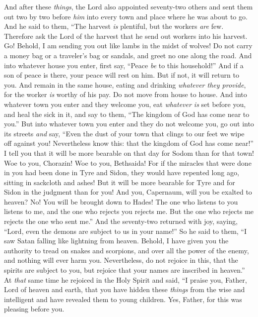 \begin{biblechapter} %
 And after these \textit{things}, the Lord also appointed seventy-two others and sent them out two by two before \textit{him} into every town and place where he was about to go.
\verse And he said to them, “The harvest \textit{is} plentiful, but the workers \textit{are} few. Therefore ask the Lord of the harvest that he send out workers into his harvest.
\verse Go! Behold, I am sending you out like lambs in the midst of wolves!
\verse Do not carry a money bag or a traveler’s bag or sandals, and greet no one along the road.
\verse And into whatever house you enter, first say, “Peace \textit{be} to this household!”
\verse And if a son of peace is there, your peace will rest on him. But if not, it will return to you.
\verse And remain in the same house, eating and drinking \textit{whatever they provide}, for the worker \textit{is} worthy of his pay. Do not move from house to house.
\verse And into whatever town you enter and they welcome you, eat \textit{whatever is} set before you,
\verse and heal the sick in it, and say to them, “The kingdom of God has come near to you.”
\verse But into whatever town you enter and they do not welcome you, go out into its streets \textit{and} say,
\verse “Even the dust of your town that clings to our feet we wipe off against you! Nevertheless know this: that the kingdom of God has come near!”
\verse I tell you that it will be more bearable on that day for Sodom than for that town!
\verse Woe to you, Chorazin! Woe to you, Bethsaida! For if the miracles that were done in you had been done in Tyre and Sidon, they would have repented long ago, sitting in sackcloth and ashes!
\verse But it will be more bearable for Tyre and for Sidon in the judgment than for you!
\verse And you, Capernaum, will you be exalted to heaven? No! You will be brought down to Hades!
\verse The one who listens to you listens to me, and the one who rejects you rejects me. But the one who rejects me rejects the one who sent me.”
\verse And the seventy-two returned with joy, saying, “Lord, even the demons are subject to us in your name!”
\verse So he said to them, “I saw Satan falling like lightning from heaven.
\verse Behold, I have given you the authority to tread on snakes and scorpions, and over all the power of the enemy, and nothing will ever harm you.
\verse Nevertheless, do not rejoice in this, that the spirits are subject to you, but rejoice that your names are inscribed in heaven.”
 At \textit{that} same time he rejoiced in the Holy Spirit and said, “I praise you, Father, Lord of heaven and earth, that you have hidden these \textit{things} from the wise and intelligent and have revealed them to young children. Yes, Father, for this was pleasing before you.

\end{biblechapter}
